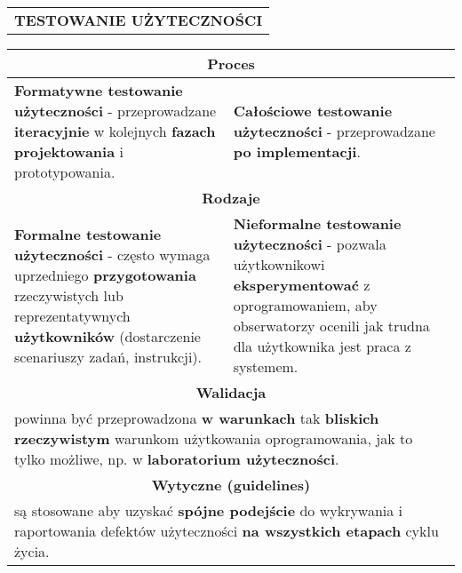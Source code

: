 \documentclass[../main.tex]{subfiles}
\begin{document}
    \begin{table}[H]
        \begin{center}
            \begin{tabular}{| p{8cm} | p{8cm} |}
                \multicolumn{2}{c}{\textbf{TESTOWANIE UŻYTECZNOŚCI}}\\
            \end{tabular}
        \end{center}
    \end{table}
    \begin{table}[H]
        \begin{center}
            \begin{tabular}{| p{8cm} | p{8cm} |}
                \hline
                \multicolumn{2}{|c|}{\textbf{Proces}} \\
                \hline
                \textbf{Formatywne testowanie użyteczności} - przeprowadzane \textbf{iteracyjnie} w
                kolejnych \textbf{fazach projektowania} i prototypowania.
                &
                \textbf{Całościowe testowanie użyteczności} - przeprowadzane \textbf{po implementacji}.
                \\
                \hline
                \hline
                \multicolumn{2}{|c|}{\textbf{Rodzaje}} \\
                \hline
                \textbf{Formalne testowanie użyteczności} - często wymaga uprzedniego \textbf{przygotowania} rzeczywistych
                lub reprezentatywnych \textbf{użytkowników} (dostarczenie scenariuszy zadań, instrukcji).
                &
                \textbf{Nieformalne testowanie użyteczności} - pozwala użytkownikowi \textbf{eksperymentować} z
                oprogramowaniem, aby obserwatorzy ocenili jak trudna dla użytkownika jest praca z systemem. \\
                \hline
                \hline
                \multicolumn{2}{|c|}{\textbf{Walidacja}} \\
                \hline
                \multicolumn{2}{|p{16,5cm}|}{powinna być przeprowadzona \textbf{w warunkach} tak \textbf{bliskich rzeczywistym} warunkom użytkowania
                oprogramowania, jak to tylko możliwe, np. w \textbf{laboratorium użyteczności}.} \\
                \hline
                \hline
                \multicolumn{2}{|c|}{\textbf{Wytyczne (guidelines)}} \\
                \hline
                \multicolumn{2}{|p{16,5cm}|}{są stosowane aby uzyskać \textbf{spójne podejście} do wykrywania i raportowania defektów
                użyteczności \textbf{na wszystkich etapach} cyklu życia.} \\
                \hline
            \end{tabular}
        \end{center}
    \end{table}
\end{document}
